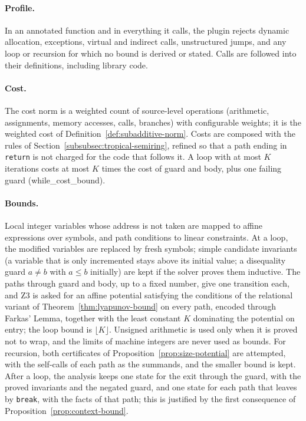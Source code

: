 \documentclass[oneside,english]{amsart}
\numberwithin{equation}{section}
\numberwithin{figure}{section}
\theoremstyle{plain}
\theoremstyle{definition}
\theoremstyle{plain}
\theoremstyle{remark}
\theoremstyle{plain}
\theoremstyle{definition}
\theoremstyle{plain}
\theoremstyle{remark}
\newcommand{\lean}[1]{{\ttfamily\small #1}}
\begin{document}
\paragraph{Profile.}
In an annotated function and in everything it calls, the plugin rejects dynamic allocation, exceptions, virtual and indirect calls, unstructured jumps, and any loop or recursion for which no bound is derived or stated. Calls are followed into their definitions, including library code.

\paragraph{Cost.}
The cost norm is a weighted count of source-level operations (arithmetic, assignments, memory accesses, calls, branches) with configurable weights; it is the weighted cost of Definition~\ref{def:subadditive-norm}. Costs are composed with the rules of Section~\ref{subsubsec:tropical-semiring}, refined so that a path ending in \texttt{return} is not charged for the code that follows it. A loop with at most $K$ iterations costs at most $K$ times the cost of guard and body, plus one failing guard (\lean{while\_\allowbreak cost\_\allowbreak bound}).

\paragraph{Bounds.}
Local integer variables whose address is not taken are mapped to affine expressions over symbols, and path conditions to linear constraints. At a loop, the modified variables are replaced by fresh symbols; simple candidate invariants (a variable that is only incremented stays above its initial value; a disequality guard $a \ne b$ with $a \le b$ initially) are kept if the solver proves them inductive. The paths through guard and body, up to a fixed number, give one transition each, and Z3 \cite{demoura2008z3} is asked for an affine potential satisfying the conditions of the relational variant of Theorem~\ref{thm:lyapunov-bound} on every path, encoded through Farkas' Lemma, together with the least constant $K$ dominating the potential on entry; the loop bound is $\lfloor K \rfloor$. Unsigned arithmetic is used only when it is proved not to wrap, and the limits of machine integers are never used as bounds. For recursion, both certificates of Proposition~\ref{prop:size-potential} are attempted, with the self-calls of each path as the summands, and the smaller bound is kept. After a loop, the analysis keeps one state for the exit through the guard, with the proved invariants and the negated guard, and one state for each path that leaves by \texttt{break}, with the facts of that path; this is justified by the first consequence of Proposition~\ref{prop:context-bound}.
\end{document}
